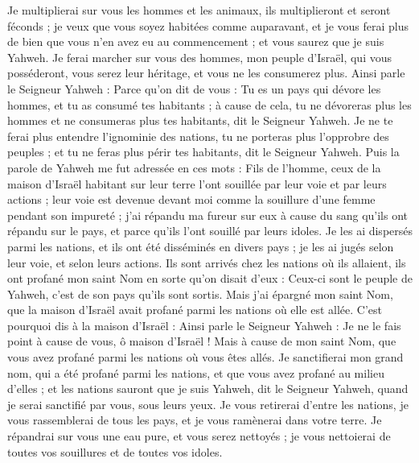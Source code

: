 \begin{multicols}{2}
Je multiplierai sur vous les hommes et les animaux, ils multiplieront et seront féconds ; je veux que vous soyez habitées comme auparavant, et je vous ferai plus de bien que vous n'en avez eu au commencement ; et vous saurez que je suis Yahweh.
Je ferai marcher sur vous des hommes, mon peuple d'Israël, qui vous posséderont, vous serez leur héritage, et vous ne les consumerez plus.
Ainsi parle le Seigneur Yahweh : Parce qu'on dit de vous : Tu es un pays qui dévore les hommes, et tu as consumé tes habitants ;
à cause de cela, tu ne dévoreras plus les hommes et ne consumeras plus tes habitants, dit le Seigneur Yahweh.
Je ne te ferai plus entendre l'ignominie des nations, tu ne porteras plus l'opprobre des peuples ; et tu ne feras plus périr tes habitants, dit le Seigneur Yahweh.
Puis la parole de Yahweh me fut adressée en ces mots :
Fils de l'homme, ceux de la maison d'Israël habitant sur leur terre l'ont souillée par leur voie et par leurs actions ; leur voie est devenue devant moi comme la souillure d'une femme pendant son impureté ;
j'ai répandu ma fureur sur eux à cause du sang qu'ils ont répandu sur le pays, et parce qu'ils l'ont souillé par leurs idoles.
Je les ai dispersés parmi les nations, et ils ont été disséminés en divers pays ; je les ai jugés selon leur voie, et selon leurs actions.
Ils sont arrivés chez les nations où ils allaient, ils ont profané mon saint Nom en sorte qu'on disait d'eux : Ceux-ci sont le peuple de Yahweh, c'est de son pays qu'ils sont sortis.
Mais j'ai épargné mon saint Nom, que la maison d'Israël avait profané parmi les nations où elle est allée.
C'est pourquoi dis à la maison d'Israël : Ainsi parle le Seigneur Yahweh : Je ne le fais point à cause de vous, ô maison d'Israël ! Mais à cause de mon saint Nom, que vous avez profané parmi les nations où vous êtes allés.
Je sanctifierai mon grand nom, qui a été profané parmi les nations, et que vous avez profané au milieu d'elles ; et les nations sauront que je suis Yahweh, dit le Seigneur Yahweh, quand je serai sanctifié par vous, sous leurs yeux.
Je vous retirerai d'entre les nations, je vous rassemblerai de tous les pays, et je vous ramènerai dans votre terre.
Je répandrai sur vous une eau pure, et vous serez nettoyés ; je vous nettoierai de toutes vos souillures et de toutes vos idoles.

\end{multicols}
